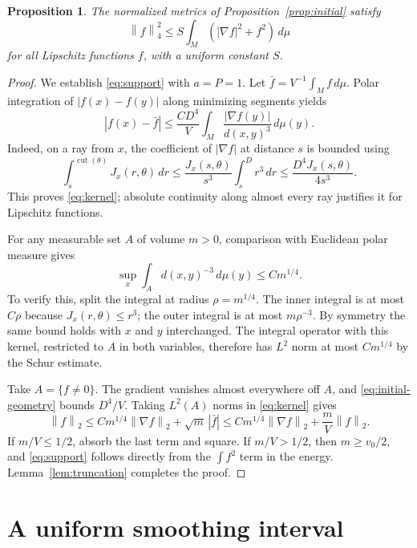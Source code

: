 \documentclass[11pt]{article}
\newtheorem{proposition}[theorem]{Proposition}
\theoremstyle{definition}
\theoremstyle{remark}
\numberwithin{equation}{section}
\newcommand{\dd}{\,d\mu}
\newcommand{\norm}[1]{\left\lVert #1\right\rVert}
\begin{document}
\begin{proposition}\label{prop:initial-sobolev}
The normalized metrics of Proposition~\ref{prop:initial} satisfy
\begin{equation}\label{eq:initial-sobolev}
 \norm f_4^2\le S\int_M(|\nabla f|^2+f^2)\dd
\end{equation}
for all Lipschitz functions $f$, with a uniform constant $S$.
\end{proposition}

\begin{proof}
We establish \eqref{eq:support} with $a=P=1$.
Let $\bar f=V^{-1}\int_Mf\dd$. Polar integration of
$|f(x)-f(y)|$ along minimizing segments yields
\begin{equation}\label{eq:kernel}
 |f(x)-\bar f|
 \le\frac{CD^4}{V}\int_M\frac{|\nabla f(y)|}{d(x,y)^3}\,d\mu(y).
\end{equation}
Indeed, on a ray from $x$, the coefficient of $|\nabla f|$ at distance
$s$ is bounded using
\[
 \int_s^{\operatorname{cut}(\theta)}J_x(r,\theta)\,dr
 \le \frac{J_x(s,\theta)}{s^3}\int_s^D r^3\,dr
 \le\frac{D^4J_x(s,\theta)}{4s^3}.
\]
This proves \eqref{eq:kernel}; absolute continuity along almost every
ray justifies it for Lipschitz functions.

For any measurable set $A$ of volume $m>0$, comparison with Euclidean
polar measure gives
\[
 \sup_x\int_A d(x,y)^{-3}\,d\mu(y)\le C m^{1/4}.
\]
To verify this, split the integral at radius $\rho=m^{1/4}$. The inner
integral is at most $C\rho$ because $J_x(r,\theta)\le r^3$; the outer
integral is at most $m\rho^{-3}$. By symmetry the same bound holds
with $x$ and $y$ interchanged. The integral operator with this kernel,
restricted to $A$ in both variables, therefore has $L^2$ norm at most
$Cm^{1/4}$ by the Schur estimate.

Take $A=\{f\ne0\}$. The gradient vanishes almost everywhere off $A$,
and \eqref{eq:initial-geometry} bounds $D^4/V$. Taking $L^2(A)$ norms
in \eqref{eq:kernel} gives
\[
 \norm f_2\le Cm^{1/4}\norm{\nabla f}_2+\sqrt m\,|\bar f|
 \le Cm^{1/4}\norm{\nabla f}_2+\frac mV\norm f_2.
\]
If $m/V\le1/2$, absorb the last term and square. If $m/V>1/2$,
then $m\ge v_0/2$, and \eqref{eq:support} follows directly from the
$\int f^2$ term in the energy. Lemma~\ref{lem:truncation} completes
the proof.
\end{proof}

\section{A uniform smoothing interval}
\label{sec:smoothing}
\end{document}
